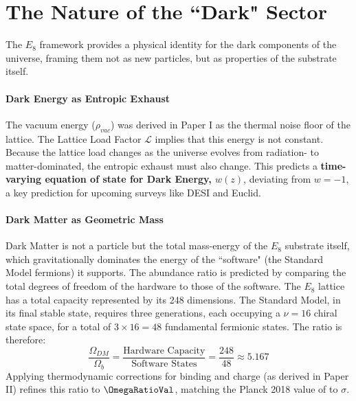 \section{The Nature of the ``Dark" Sector}
The $E_8$ framework provides a physical identity for the dark components of the universe, framing them not as new particles, but as properties of the substrate itself.

\paragraph{Dark Energy as Entropic Exhaust}
The vacuum energy ($\rho_{vac}$) was derived in Paper I as the thermal noise floor of the lattice. The Lattice Load Factor $\mathcal{L}$ implies that this energy is not constant. Because the lattice load changes as the universe evolves from radiation- to matter-dominated, the entropic exhaust must also change. This predicts a \textbf{time-varying equation of state for Dark Energy, $w(z)$}, deviating from $w=-1$, a key prediction for upcoming surveys like DESI and Euclid.


\paragraph{Dark Matter as Geometric Mass}
Dark Matter is not a particle but the total mass-energy of the $E_8$ substrate itself, which gravitationally dominates the energy of the ``software" (the Standard Model fermions) it supports. The abundance ratio is predicted by comparing the total degrees of freedom of the hardware to those of the software. The $E_8$ lattice has a total capacity represented by its 248 dimensions. The Standard Model, in its final stable state, requires three generations, each occupying a $\nu=16$ chiral state space, for a total of $3 \times 16 = 48$ fundamental fermionic states. The ratio is therefore:
\begin{equation}
    \frac{\Omega_{DM}}{\Omega_b} = \frac{\text{Hardware Capacity}}{\text{Software States}} = \frac{248}{48} \approx 5.167
\end{equation}
Applying thermodynamic corrections for binding and charge (as derived in Paper II) refines this ratio to $\mathbf{\OmegaRatioVal}$, matching the Planck 2018 value of \OmegaRatioExperimentalValue to \OmegaRatioSigma $\sigma$.


